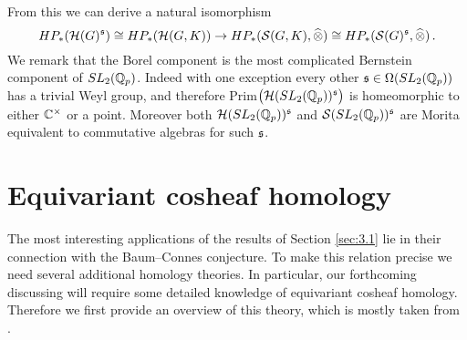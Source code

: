 From this we can derive a natural isomorphism
\[
HP_* (\mathcal H (G)^{\mathfrak s}) \cong HP_* (\mathcal H (G,K)) \to 
HP_* (\mathcal S (G,K), \widehat{\otimes}) \cong HP_* (\mathcal S (G)^{\mathfrak s} ,\widehat{\otimes}) \,.
\]
We remark that the Borel component is the most complicated
Bernstein component of $SL_2 (\mathbb Q_p )$. Indeed with one exception 
every other $\mathfrak s \in \Omega (SL_2 (\mathbb Q_p ))$ has a trivial Weyl group, 
and therefore Prim$ \big( \mathcal H (SL_2 (\mathbb Q_p ))^{\mathfrak s} \big)$ is 
homeomorphic to either $\mathbb C^\times$ or a point. Moreover both 
$\mathcal H (SL_2 (\mathbb Q_p ))^{\mathfrak s}$ and $\mathcal S (SL_2 (\mathbb Q_p ))^{\mathfrak s}$
are Morita equivalent to commutative algebras for such $\mathfrak s$.
\vspace{4mm}




\section{Equivariant cosheaf homology}
\label{sec:3.3}

The most interesting applications of the results of Section \ref{sec:3.1} 
lie in their connection with the Baum--Connes conjecture. 
To make this relation precise we need several additional homology theories.
In particular, our forthcoming discussing will require some detailed knowledge
of equivariant cosheaf homology. Therefore we first provide an overview of this 
theory, which is mostly taken from \cite{BCH,HiNi}.

